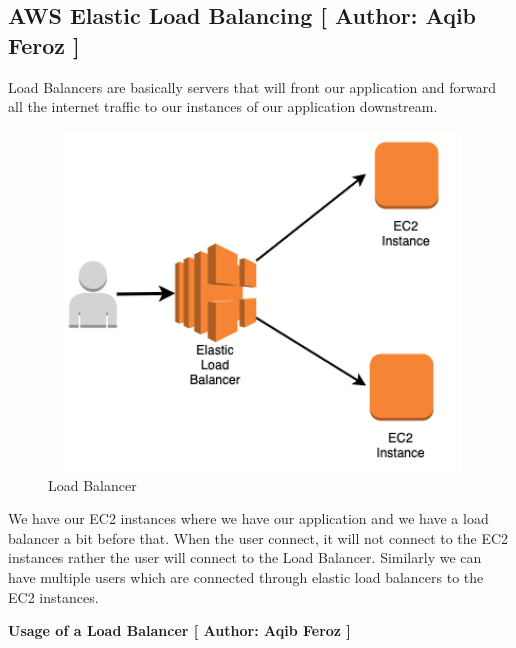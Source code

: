\subsection{AWS Elastic Load Balancing [ Author: Aqib Feroz ]}

Load Balancers are basically servers that will front our application and forward all the internet traffic to our instances of our application downstream. 
\begin{figure}[h]
    \centering
    \includegraphics[scale=1.3, width=16cm, height=9cm]{images/Aqib Feroz/load-balancer.png}
    \caption{Load Balancer}
    \label{fig:my_label}
\end{figure}

We have our EC2 instances where we have our application and we have a load balancer a bit before that. When the user connect, it will not connect to the EC2 instances rather the user will connect to the Load Balancer. Similarly we can have multiple users which are connected through elastic load balancers to the EC2 instances.

\textbf{Usage of a Load Balancer [ Author: Aqib Feroz ]}


